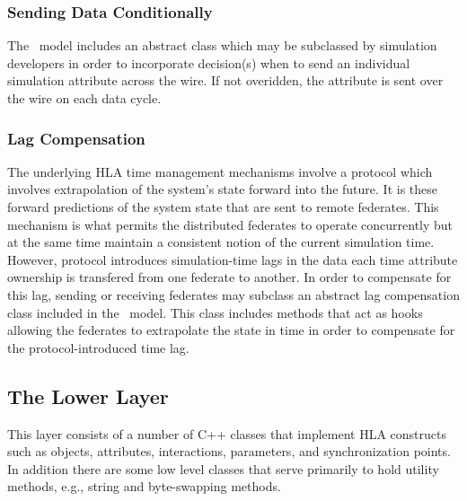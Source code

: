 \subsubsection{Sending Data Conditionally}

The \TrickHLA\ model includes an abstract class which may be subclassed by 
simulation developers in order to incorporate decision(s) when to send an individual
simulation attribute across the wire. If not overidden, the attribute is sent over the
wire on each data cycle.

\subsubsection{Lag Compensation}

The underlying HLA time management mechanisms involve a protocol which involves 
extrapolation of the system's state forward into the future.  
It is these forward predictions of the system state that are sent to remote federates.
This mechanism is what permits the distributed federates to operate concurrently 
but at the same time maintain a consistent notion of the current simulation time.
However, protocol introduces simulation-time lags in the data each time attribute
ownership is transfered from one federate to another.
In order to compensate for this lag, sending or receiving federates may subclass
an abstract lag compensation class included in the \TrickHLA\ model.
This class includes methods that act as hooks allowing the federates to 
extrapolate the state in time in order to compensate for the protocol-introduced
time lag.

\subsection{The Lower Layer}

This layer consists of a number of C++ classes that implement HLA constructs such as
objects, attributes, interactions, parameters, and synchronization points.
In addition there are some low level classes that serve primarily to hold utility methods,
e.g., string and byte-swapping methods.

